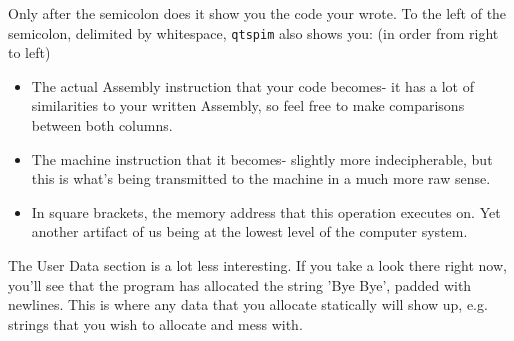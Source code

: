 \documentclass[english, 10pt]{article}
\begin{document}
{\newline


}

Only after the semicolon does it show you the code your wrote. To the left of the semicolon, delimited by whitespace, \texttt{qtspim} also shows you: (in order from right to left)\newline

\begin{itemize}
	\item The actual Assembly instruction that your code becomes- it has a lot of similarities to your written Assembly, so feel free to make comparisons between both columns.
	\item The machine instruction that it becomes- slightly more indecipherable, but this is what's being transmitted to the machine in a much more raw sense.
	\item In square brackets, the memory address that this operation executes on. Yet another artifact of us being at the lowest level of the computer system.
\end{itemize}

The User Data section is a lot less interesting. If you take a look there right now, you'll see that the program has allocated the string 'Bye Bye', padded with newlines. This is where any data that you allocate statically will show up, e.g. strings that you wish to allocate and mess with.
\end{document}
